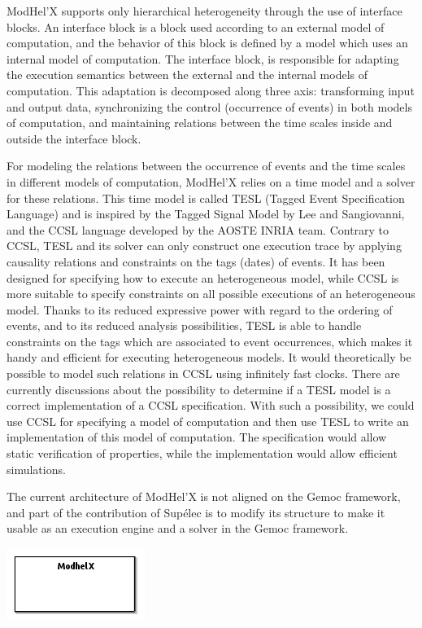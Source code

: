 \documentclass{gemoc} %
\begin{document}
ModHel'X supports only hierarchical heterogeneity through the use of interface blocks. An interface block is a block used according to an external model of computation, and the behavior of this block is defined by a model which uses an internal model of computation. The interface block, is responsible for adapting the execution semantics between the external and the internal models of computation. This adaptation is decomposed along three axis: transforming input and output data, synchronizing the control (occurrence of events) in both models of computation, and maintaining relations between the time scales inside and outside the interface block.

For modeling the relations between the occurrence of events and the time scales in different models of computation, ModHel'X relies on a time model and a solver for these relations. This time model is called TESL (Tagged Event Specification Language) and is inspired by the Tagged Signal Model by Lee and Sangiovanni, and the CCSL language developed by the AOSTE INRIA team. Contrary to CCSL, TESL and its solver can only construct one execution trace by applying causality relations and constraints on the tags (dates) of events. It has been designed for specifying how to execute an heterogeneous model, while CCSL is more suitable to specify constraints on all possible executions of an heterogeneous model. Thanks to its reduced expressive power with regard to the ordering of events, and to its reduced analysis possibilities, TESL is able to handle constraints on the tags which are associated to event occurrences, which makes it handy and efficient for executing heterogeneous models. It would theoretically be possible to model such relations in CCSL using infinitely fast clocks. There are currently discussions about the possibility to determine if a TESL model is a correct implementation of a CCSL specification. With such a possibility, we could use CCSL for specifying a model of computation and then use TESL to write an implementation of this model of computation. The specification would allow static verification of properties, while the implementation would allow efficient simulations.

The current architecture of ModHel'X is not aligned on the Gemoc framework, and part of the contribution of Supélec is to modify its structure to make it usable as an execution engine and a solver in the Gemoc framework.
\begin{center}
\includegraphics*[trim=0.0cm 0.0cm 0cm 0.0cm, clip=true]{../images/generated/Generated_ModhelX.png}
\end{center}
\end{document}
